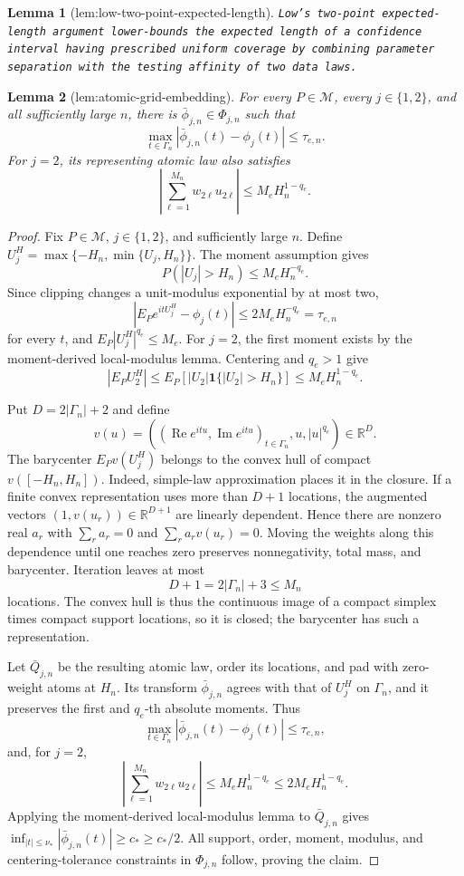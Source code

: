 \documentclass{article}
\newtheorem{lemma}{Lemma}
\begin{document}
\begin{lemma}[lem:low-two-point-expected-length]\label{lem:low-two-point-expected-length}
\texttt{Low's two-\allowbreak{}point expected-\allowbreak{}length argument lower-\allowbreak{}bounds the expected length of a confidence interval having prescribed uniform coverage by combining parameter separation with the testing affinity of two data laws.}
\end{lemma}

\begin{lemma}[lem:atomic-grid-embedding]\label{lem:atomic-grid-embedding}
For every \(P\in\mathcal M\), every \(j\in\{1,2\}\), and all sufficiently large \(n\), there is \(\bar\phi_{j,n}\in\Phi_{j,n}\) such that
\[
 \max_{t\in\Gamma_n}|\bar\phi_{j,n}(t)-\phi_j(t)|\le \tau_{e,n}.
\]
For \(j=2\), its representing atomic law also satisfies
\[
 \left|\sum_{\ell=1}^{M_n}w_{2\ell}u_{2\ell}\right|
 \le M_eH_n^{1-q_e}.
\]
\end{lemma}
\begin{proof}
Fix \(P\in\mathcal M\), \(j\in\{1,2\}\), and sufficiently large \(n\). Define \(U_j^H=\max\{-H_n,\min\{U_j,H_n\}\}\). The moment assumption gives
\[
 P(|U_j|>H_n)\le M_eH_n^{-q_e}.
\]
Since clipping changes a unit-modulus exponential by at most two,
\[
 |E_Pe^{itU_j^H}-\phi_j(t)|
 \le2M_eH_n^{-q_e}=\tau_{e,n}
\]
for every \(t\), and \(E_P|U_j^H|^{q_e}\le M_e\). For \(j=2\), the first moment exists by the moment-derived local-modulus lemma. Centering and \(q_e>1\) give
\[
 |E_PU_2^H|
 \le E_P[|U_2|\mathbf1\{|U_2|>H_n\}]
 \le M_eH_n^{1-q_e}.
\]

Put \(D=2|\Gamma_n|+2\) and define
\[
 v(u)=\left((\operatorname{Re}e^{itu},\operatorname{Im}e^{itu})_{t\in\Gamma_n},u,|u|^{q_e}\right)\in\mathbb R^D.
\]
The barycenter \(E_Pv(U_j^H)\) belongs to the convex hull of compact \(v([-H_n,H_n])\). Indeed, simple-law approximation places it in the closure. If a finite convex representation uses more than \(D+1\) locations, the augmented vectors \((1,v(u_r))\in\mathbb R^{D+1}\) are linearly dependent. Hence there are nonzero real \(a_r\) with \(\sum_ra_r=0\) and \(\sum_ra_rv(u_r)=0\). Moving the weights along this dependence until one reaches zero preserves nonnegativity, total mass, and barycenter. Iteration leaves at most
\[
 D+1=2|\Gamma_n|+3\le M_n
\]
locations. The convex hull is thus the continuous image of a compact simplex times compact support locations, so it is closed; the barycenter has such a representation.

Let \(\bar Q_{j,n}\) be the resulting atomic law, order its locations, and pad with zero-weight atoms at \(H_n\). Its transform \(\bar\phi_{j,n}\) agrees with that of \(U_j^H\) on \(\Gamma_n\), and it preserves the first and \(q_e\)-th absolute moments. Thus
\[
 \max_{t\in\Gamma_n}|\bar\phi_{j,n}(t)-\phi_j(t)|\le\tau_{e,n},
\]
and, for \(j=2\),
\[
 \left|\sum_{\ell=1}^{M_n}w_{2\ell}u_{2\ell}\right|
 \le M_eH_n^{1-q_e}\le2M_eH_n^{1-q_e}.
\]
Applying the moment-derived local-modulus lemma to \(\bar Q_{j,n}\) gives \(\inf_{|t|\le\nu_*}|\bar\phi_{j,n}(t)|\ge c_*\ge c_*/2\). All support, order, moment, modulus, and centering-tolerance constraints in \(\Phi_{j,n}\) follow, proving the claim.
\end{proof}
\end{document}
